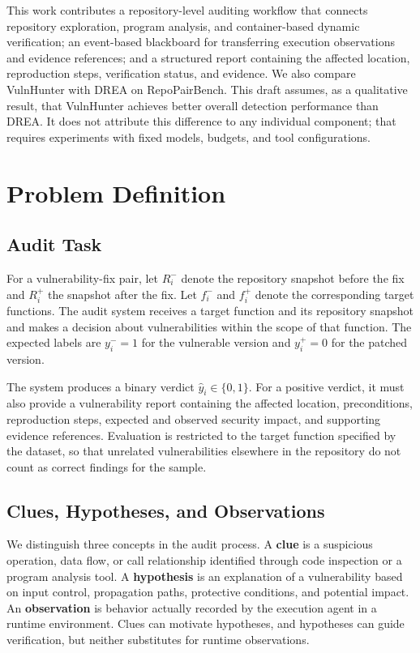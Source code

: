 \documentclass[10pt,a4paper]{article}
\begin{document}
This work contributes a repository-level auditing workflow that connects repository exploration, program analysis, and container-based dynamic verification; an event-based blackboard for transferring execution observations and evidence references; and a structured report containing the affected location, reproduction steps, verification status, and evidence. We also compare VulnHunter with DREA on RepoPairBench. This draft assumes, as a qualitative result, that VulnHunter achieves better overall detection performance than DREA. It does not attribute this difference to any individual component; that requires experiments with fixed models, budgets, and tool configurations.

\section{Problem Definition}

\subsection{Audit Task}

For a vulnerability-fix pair, let \(R_i^{-}\) denote the repository snapshot before the fix and \(R_i^{+}\) the snapshot after the fix. Let \(f_i^{-}\) and \(f_i^{+}\) denote the corresponding target functions. The audit system receives a target function and its repository snapshot and makes a decision about vulnerabilities within the scope of that function. The expected labels are \(y_i^{-}=1\) for the vulnerable version and \(y_i^{+}=0\) for the patched version.

The system produces a binary verdict \(\hat{y}_i \in \{0,1\}\). For a positive verdict, it must also provide a vulnerability report containing the affected location, preconditions, reproduction steps, expected and observed security impact, and supporting evidence references. Evaluation is restricted to the target function specified by the dataset, so that unrelated vulnerabilities elsewhere in the repository do not count as correct findings for the sample.

\subsection{Clues, Hypotheses, and Observations}

We distinguish three concepts in the audit process. A \textbf{clue} is a suspicious operation, data flow, or call relationship identified through code inspection or a program analysis tool. A \textbf{hypothesis} is an explanation of a vulnerability based on input control, propagation paths, protective conditions, and potential impact. An \textbf{observation} is behavior actually recorded by the execution agent in a runtime environment. Clues can motivate hypotheses, and hypotheses can guide verification, but neither substitutes for runtime observations.
\end{document}
